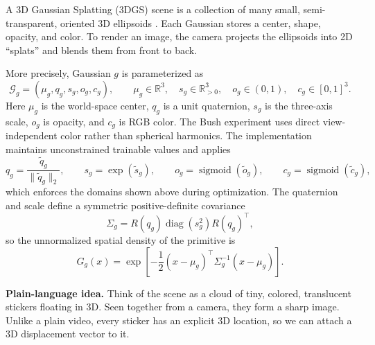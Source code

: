\documentclass[10pt]{article}
\newcommand{\plainidea}[1]{%
  \vspace{0.25em}
  \noindent\colorbox{SoftGray}{%
    \parbox{\dimexpr\linewidth-2\fboxsep\relax}{%
      \textbf{Plain-language idea.} #1}}
  \vspace{0.25em}
}
\begin{document}
A 3D Gaussian Splatting (3DGS) scene is a collection of many small,
semi-transparent, oriented 3D ellipsoids \cite{kerbl2023gaussians}. Each
Gaussian stores a center, shape, opacity, and color. To render an image, the
camera projects the ellipsoids into 2D ``splats'' and blends them from front to
back.

More precisely, Gaussian $g$ is parameterized as
\begin{equation}
  \mathcal G_g=(\mu_g,q_g,s_g,o_g,c_g),
  \qquad
  \mu_g\in\mathbb R^3,
  \quad s_g\in\mathbb R_{>0}^3,
  \quad o_g\in(0,1),
  \quad c_g\in[0,1]^3.
\end{equation}
Here $\mu_g$ is the world-space center, $q_g$ is a unit quaternion, $s_g$ is
the three-axis scale, $o_g$ is opacity, and $c_g$ is RGB color. The Bush
experiment uses direct view-independent color rather than spherical harmonics.
The implementation maintains unconstrained trainable values and applies
\begin{equation}
  q_g=\frac{\widetilde q_g}{\lVert\widetilde q_g\rVert_2},
  \qquad s_g=\exp(\widetilde s_g),
  \qquad o_g=\operatorname{sigmoid}(\widetilde o_g),
  \qquad c_g=\operatorname{sigmoid}(\widetilde c_g),
\end{equation}
which enforces the domains shown above during optimization.
The quaternion and scale define a symmetric positive-definite covariance
\begin{equation}
  \Sigma_g
  =R(q_g)\operatorname{diag}(s_g^2)R(q_g)^\top,
\end{equation}
so the unnormalized spatial density of the primitive is
\begin{equation}
  G_g(x)
  =\exp\!\left[
    -\frac{1}{2}(x-\mu_g)^\top\Sigma_g^{-1}(x-\mu_g)
  \right].
\end{equation}

\plainidea{Think of the scene as a cloud of tiny, colored, translucent stickers
floating in 3D. Seen together from a camera, they form a sharp image. Unlike a
plain video, every sticker has an explicit 3D location, so we can attach a 3D
displacement vector to it.}
\end{document}
